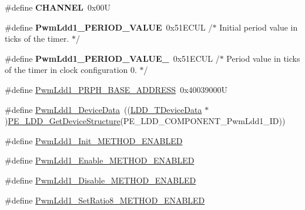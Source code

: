 \begin{DoxyCompactItemize}
\item 
\mbox{\label{group___pwm_ldd1__module_gace6a11e892466500d47d1f45f042bc53}} 
\#define {\bfseries C\+H\+A\+N\+N\+EL}~0x00U
\item 
\mbox{\label{group___pwm_ldd1__module_ga84cbb2ece08b2bbcf18cd8d11cd04be6}} 
\#define {\bfseries Pwm\+Ldd1\+\_\+\+P\+E\+R\+I\+O\+D\+\_\+\+V\+A\+L\+UE}~0x51\+E\+C\+U\+L  /$\ast$ Initial period value in ticks of the timer. $\ast$/
\item 
\mbox{\label{group___pwm_ldd1__module_gacdcbd23818cd671814d7de57743ed9dc}} 
\#define {\bfseries Pwm\+Ldd1\+\_\+\+P\+E\+R\+I\+O\+D\+\_\+\+V\+A\+L\+U\+E\+\_}~0x51\+E\+C\+U\+L /$\ast$ Period value in ticks of the timer in clock configuration 0. $\ast$/
\item 
\#define \hyperlink{group___pwm_ldd1__module_gaa604ec73f2dc5e1e562b5db4340b6812}{Pwm\+Ldd1\+\_\+\+P\+R\+P\+H\+\_\+\+B\+A\+S\+E\+\_\+\+A\+D\+D\+R\+E\+SS}~0x40039000U
\item 
\#define \hyperlink{group___pwm_ldd1__module_ga1b3859d3bd55122c9154a66be455b8d9}{Pwm\+Ldd1\+\_\+\+Device\+Data}~((\hyperlink{group___p_e___types__module_gac5cf1362f1f0e3a2ce71b1bf2276d091}{L\+D\+D\+\_\+\+T\+Device\+Data} $\ast$)\hyperlink{group___p_e___types__module_gaa1c23d559daef5bcd3327ca83fb56f5a}{P\+E\+\_\+\+L\+D\+D\+\_\+\+Get\+Device\+Structure}(P\+E\+\_\+\+L\+D\+D\+\_\+\+C\+O\+M\+P\+O\+N\+E\+N\+T\+\_\+\+Pwm\+Ldd1\+\_\+\+ID))
\item 
\#define \hyperlink{group___pwm_ldd1__module_gaa38fc755e64052f475cb0e4d21450e14}{Pwm\+Ldd1\+\_\+\+Init\+\_\+\+M\+E\+T\+H\+O\+D\+\_\+\+E\+N\+A\+B\+L\+ED}
\item 
\#define \hyperlink{group___pwm_ldd1__module_ga0d9fa98a838e2a25d5ef5319701bf61a}{Pwm\+Ldd1\+\_\+\+Enable\+\_\+\+M\+E\+T\+H\+O\+D\+\_\+\+E\+N\+A\+B\+L\+ED}
\item 
\#define \hyperlink{group___pwm_ldd1__module_ga69538cfd5c66c3177eb90a64e9d305bf}{Pwm\+Ldd1\+\_\+\+Disable\+\_\+\+M\+E\+T\+H\+O\+D\+\_\+\+E\+N\+A\+B\+L\+ED}
\item 
\#define \hyperlink{group___pwm_ldd1__module_ga5f646ad9b96a3a15f717bb1afac5934f}{Pwm\+Ldd1\+\_\+\+Set\+Ratio8\+\_\+\+M\+E\+T\+H\+O\+D\+\_\+\+E\+N\+A\+B\+L\+ED}
\end{DoxyCompactItemize}
